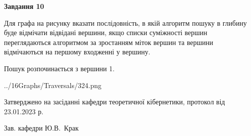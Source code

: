 \documentclass[12pt, ukrainian]{article}
\begin{document}
{\begin {large}
{\begin {center}\textbf{Завдання 10}\end {center}}\par
Для графа на рисунку вказати послідовність, в якій алгоритм пошуку в глибину буде відмічати відвідані вершини, якщо списки суміжності вершин переглядаються алгоритмом за зростанням міток вершин та вершини відмічаються на першому вход\-женні у вершину.\par
Пошук розпочинається з вершини 1.\par

\begin{center}
	{../16Graphs/Traversals/324.png}
\end{center}\par
\newpage


\end {large}
}
{\smallskip \begin {small} Затверджено на засіданні кафедри теоретичної кібернетики, протокол  від   23.01.2023 р.\par\smallskip\smallskip
{\parbox {6.5 cm}{Зав. кафедри \dotfill Ю.В.~Крак}} \end{small}}
\end{document}
